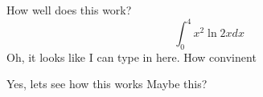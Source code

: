 \documentclass{article}
\begin{document}
How well does this work?
$$\int_0^4 x^2 \ln{2x}dx$$
Oh, it looks like I can type in here. 
How convinent

Yes, lets see how this works Maybe this?
\end{document}
